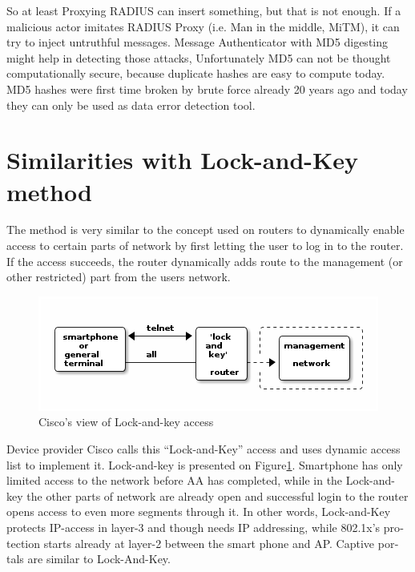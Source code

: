 \documentclass[12pt,a4paper,english]{tutthesis}
\begin{document}
\begin{otherlanguage}{english}
So at least Proxying RADIUS can insert something, but that is not
enough.  If a malicious actor imitates RADIUS Proxy (i.e. Man in the
middle, MiTM), it can try to inject untruthful messages. 
Message Authenticator with MD5 digesting
might help in detecting those attacks,
Unfortunately MD5 can not be thought computationally
secure, because duplicate hashes are easy to compute
today\cite{xie2013fast}.
MD5 hashes were first time broken by brute force
already 20 years ago and today they can only be used as data error
detection tool\cite[p.2]{rfc6151}. 



\section{Similarities with Lock-and-Key method}
\label{sec-4-8}
The method is very similar to the concept used on routers to dynamically enable
access to certain parts of network by first letting the user to log in
to the router. If the access succeeds, the router dynamically adds
route to the management (or other restricted) part from the 
users network.









\begin{figure}[htb]
\centering
\includegraphics[width=.9\linewidth]{lockandkey.png}
\caption{\label{fig:lock-and-view}Cisco's view of Lock-and-key access}
\end{figure}




Device provider Cisco calls this
 ``Lock-and-Key''
access and uses dynamic access list to implement it\cite[p.117]{lockandkeybook}.
Lock-and-key is presented on Figure\ref{fig:lock-and-view}.
 Smartphone has only limited access to the network before AA
has completed, while in the Lock-and-key
the other parts of network are already open and successful login to the router opens
access to even more segments through it. In other words, Lock-and-Key
protects IP-access in layer-3 and though needs IP addressing, while
802.1x's protection starts already at layer-2 between the smart phone
and AP. Captive portals are similar to Lock-And-Key.



\end{otherlanguage}
\end{document}
